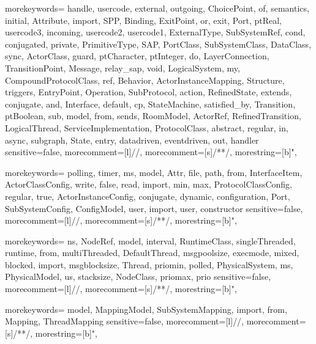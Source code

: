


{morekeywords={
	handle,
	usercode,
	external,
	outgoing,
	ChoicePoint,
	of,
	semantics,
	initial,
	Attribute,
	import,
	SPP,
	Binding,
	ExitPoint,
	or,
	exit,
	Port,
	ptReal,
	usercode3,
	incoming,
	usercode2,
	usercode1,
	ExternalType,
	SubSystemRef,
	cond,
	conjugated,
	private,
	PrimitiveType,
	SAP,
	PortClass,
	SubSystemClass,
	DataClass,
	sync,
	ActorClass,
	guard,
	ptCharacter,
	ptInteger,
	do,
	LayerConnection,
	TransitionPoint,
	Message,
	relay_sap,
	void,
	LogicalSystem,
	my,
	CompoundProtocolClass,
	ref,
	Behavior,
	ActorInstanceMapping,
	Structure,
	triggers,
	EntryPoint,
	Operation,
	SubProtocol,
	action,
	RefinedState,
	extends,
	conjugate,
	and,
	Interface,
	default,
	cp,
	StateMachine,
	satisfied_by,
	Transition,
	ptBoolean,
	sub,
	model,
	from,
	sends,
	RoomModel,
	ActorRef,
	RefinedTransition,
	LogicalThread,
	ServiceImplementation,
	ProtocolClass,
	abstract,
	regular,
	in,
	async,
	subgraph,
	State,
	entry,
	datadriven,
	eventdriven,
	out,
	handler
}
sensitive=false,
morecomment=[l]{//},
morecomment=[s]{/*}{*/},
morestring=[b]",
} 


{morekeywords={
	polling,
	timer,
	ms,
	model,
	Attr,
	file,
	path,
	from,
	InterfaceItem,
	ActorClassConfig,
	write,
	false,
	read,
	import,
	min,
	max,
	ProtocolClassConfig,
	regular,
	true,
	ActorInstanceConfig,
	conjugate,
	dynamic,
	configuration,
	Port,
	SubSystemConfig,
	ConfigModel,
	user,
	import,
	user,
	constructor
}
sensitive=false,
morecomment=[l]{//},
morecomment=[s]{/*}{*/},
morestring=[b]",
} 

{morekeywords={
	ns,
	NodeRef,
	model,
	interval,
	RuntimeClass,
	singleThreaded,
	runtime,
	from,
	multiThreaded,
	DefaultThread,
	msgpoolsize,
	execmode,
	mixed,
	blocked,
	import,
	msgblocksize,
	Thread,
	priomin,
	polled,
	PhysicalSystem,
	ms,
	PhysicalModel,
	us,
	stacksize,
	NodeClass,
	priomax,
	prio
}
sensitive=false,
morecomment=[l]{//},
morecomment=[s]{/*}{*/},
morestring=[b]",
} 

{morekeywords={
	model,
	MappingModel,
	SubSystemMapping,
	import,
	from,
	Mapping,
	ThreadMapping
}
sensitive=false,
morecomment=[l]{//},
morecomment=[s]{/*}{*/},
morestring=[b]",
} 
